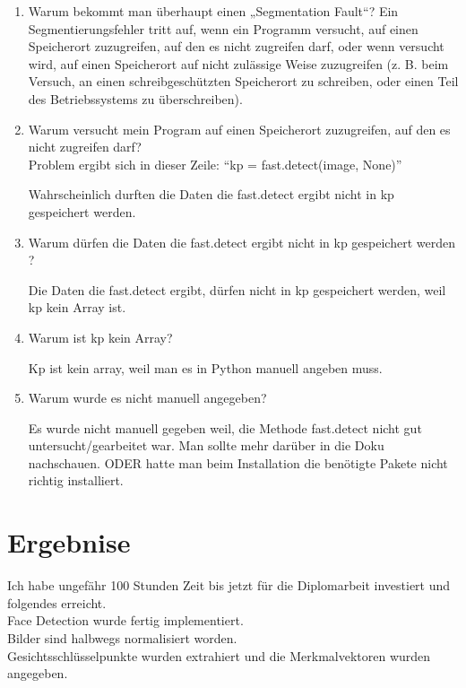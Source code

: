 \begin{enumerate}
	\item 	Warum bekommt man überhaupt einen „Segmentation Fault“? 
	Ein Segmentierungsfehler tritt auf, wenn ein Programm versucht, auf einen Speicherort zuzugreifen, auf den es nicht zugreifen darf, oder wenn versucht wird, auf einen Speicherort auf nicht zulässige Weise zuzugreifen (z. B. beim Versuch, an einen schreibgeschützten Speicherort zu schreiben, oder einen Teil des Betriebssystems zu überschreiben).\\
	\item 	Warum versucht mein Program auf einen Speicherort zuzugreifen, auf den es nicht zugreifen darf?\\
	
	Problem ergibt sich in dieser Zeile: 
	“kp = fast.detect(image, None)”
	
	Wahrscheinlich durften die Daten die fast.detect ergibt nicht in kp gespeichert werden. 
	
	\item	Warum dürfen die Daten die fast.detect ergibt nicht in kp gespeichert werden ? 
	
	Die Daten die fast.detect ergibt, dürfen nicht in kp gespeichert werden, weil kp kein Array ist. 
	
	\item	Warum ist kp kein Array? 
	
	Kp ist kein array, weil man es in Python  manuell angeben muss.
	
	\item Warum wurde es nicht manuell angegeben? 
	
	Es wurde nicht manuell gegeben weil, die Methode fast.detect nicht gut untersucht/gearbeitet war. Man sollte mehr darüber in die Doku nachschauen.
	ODER hatte man beim Installation die benötigte Pakete nicht richtig installiert. 
	
\end{enumerate}
\section{Ergebnise}
Ich habe ungefähr 100 Stunden Zeit bis jetzt für die Diplomarbeit investiert und folgendes erreicht.\\ 
Face Detection wurde fertig implementiert.\\
Bilder sind halbwegs normalisiert worden. \\
Gesichtsschlüsselpunkte wurden extrahiert und die Merkmalvektoren wurden angegeben.  \\


